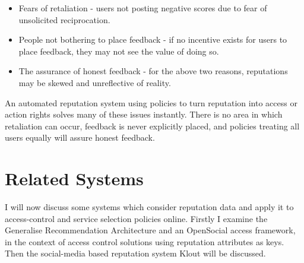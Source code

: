 \begin{itemize}
 \item Fears of retaliation - users not posting negative scores due to fear of unsolicited reciprocation.
 \item People not bothering to place feedback - if no incentive exists for users to place feedback, they may not see the value of doing so.
 \item The assurance of honest feedback - for the above two reasons, reputations may be skewed and unreflective of reality.
\end{itemize}

An automated reputation system using policies to turn reputation into access or action rights solves many of these issues instantly. There is no area in which retaliation can occur, feedback is never explicitly placed, and policies treating all users equally will assure honest feedback.

\section{Related Systems}

I will now discuss some systems which consider reputation data and apply it to access-control and service selection policies online. Firstly I examine the Generalise Recommendation Architecture and an OpenSocial access framework, in the context of access control solutions using reputation attributes as keys. Then the social-media based reputation system Klout will be discussed. 


